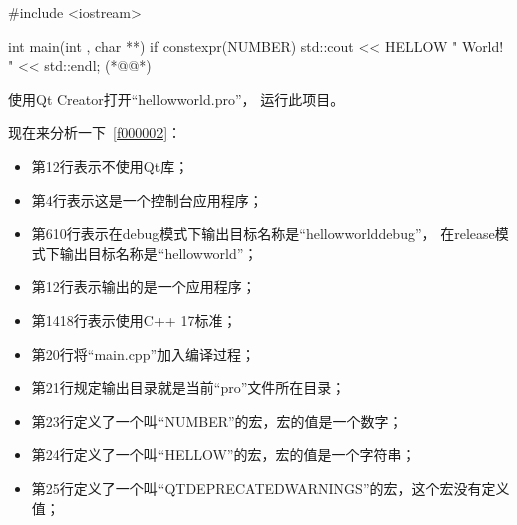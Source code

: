 \label{f000003}    %
\FloatBarrier                                  %
\begin{thebookfilesourceone}[escapeinside={(*@}{@*)},
caption=GoodLuck,
title=\filesourcenumbernameone \thefilesourcenumber
]
#include <iostream>

int main(int , char **) {
    if constexpr(NUMBER) {
        std::cout << HELLOW " World! "
                  << std::endl;
    }
}(*@\marginpar[\hfill\setlength\fboxsep{2pt}\fbox{\footnotesize{\kaishu\parbox{1em}{\setlength{\baselineskip}{2pt}\filesourcenumbernameone}}\footnotesize{\thefilesourcenumber}}]{\setlength\fboxsep{2pt}\fbox{\footnotesize{\kaishu\parbox{1em}{\setlength{\baselineskip}{2pt}\filesourcenumbernameone}}\footnotesize{\thefilesourcenumber}}}@*)\end{thebookfilesourceone}          %
\addtocounter{lstlisting}{-1}   %


使用Qt Creator打开“hellow\underline{\hspace{0.5em}}world.pro”，
运行此项目。

现在来分析一下\filesourcenumbernameone\ \ref{f000002}：
\begin{itemize}
\item 第1\raisebox{0.16ex}{\sourcefonttwo\~{}}2行表示不使用Qt库；
\item 第4行表示这是一个控制台应用程序；
\item 第6\raisebox{0.16ex}{\sourcefonttwo\~{}}10行表示在debug模式下输出目标名称是“hellow\underline{\hspace{0.5em}}world\underline{\hspace{0.5em}}debug”，
在release模式下输出目标名称是“hellow\underline{\hspace{0.5em}}world”；
\item 第12行表示输出的是一个应用程序；
\item 第14\raisebox{0.16ex}{\sourcefonttwo\~{}}18行表示使用C{\sourcefonttwo{}+}{\sourcefonttwo{}+} 17标准；
\item 第20行将“main.cpp”加入编译过程；
\item 第21行规定输出目录就是当前“pro”文件所在目录；
\item 第23行定义了一个叫“NUMBER”的宏，宏的值是一个数字；
\item 第24行定义了一个叫“HELLOW”的宏，宏的值是一个字符串；
\item 第25行定义了一个叫“QT\underline{\hspace{0.5em}}DEPRECATED\underline{\hspace{0.5em}}WARNINGS”的宏，这个宏没有定义值；
\end{itemize}

